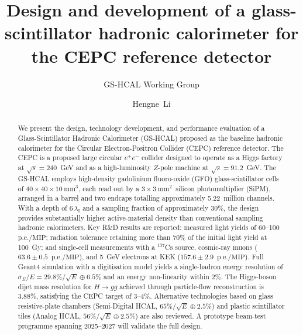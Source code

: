 \documentclass[preprint,12pt,times]{elsarticle}
\newcommand{\lambdaI}{\ensuremath{\lambda_{\mathrm{I}}}\xspace}
\newcommand{\peMIP}{\ensuremath{\text{p.e.}/\text{MIP}}\xspace}
\newcommand{\cellsize}{\ensuremath{40\times40\times10~\text{mm}^{3}}\xspace}
\newcommand{\sipmsize}{\ensuremath{3\times3~\text{mm}^{2}}\xspace}
\begin{document}
\begin{frontmatter}

\title{Design and development of a glass-scintillator hadronic calorimeter
for the CEPC reference detector}

\author[scnu]{GS-HCAL Working Group}

\author[scnu]{Hengne~Li}


\begin{abstract}
We present the design, technology development, and performance evaluation
of a Glass-Scintillator Hadronic Calorimeter (GS-HCAL) proposed as the
baseline hadronic calorimeter for the Circular Electron-Positron Collider
(CEPC) reference detector.
The CEPC is a proposed large circular $e^{+}e^{-}$ collider designed to
operate as a Higgs factory at $\sqrt{s}=240$~GeV and as a high-luminosity
$Z$-pole machine at $\sqrt{s}=91.2$~GeV.
The GS-HCAL employs high-density gadolinium fluoro-oxide (GFO)
glass-scintillator cells of \cellsize, each read out by a
\sipmsize~silicon photomultiplier (SiPM), arranged in a barrel and two
endcaps totalling approximately 5.22~million channels.
With a depth of $6\,\lambdaI$ and a sampling fraction of approximately
30\%, the design provides substantially higher active-material density
than conventional sampling hadronic calorimeters.
Key R\&D results are reported: measured light yields of 60--100~\peMIP;
radiation tolerance retaining more than 70\% of the initial light yield
at \SI{100}{Gy}; and single-cell measurements with a $^{137}$Cs source,
cosmic-ray muons ($63.6\pm0.5$~\peMIP), and \SI{5}{GeV} electrons at
KEK ($157.6\pm2.9$~\peMIP).
Full Geant4 simulation with a digitisation model yields a single-hadron
energy resolution of $\sigma_{E}/E = 29.8\%/\sqrt{E}\oplus6.5\%$ and
an energy non-linearity within 2\%.
The Higgs-boson dijet mass resolution for $H\to gg$ achieved through
particle-flow reconstruction is 3.88\%, satisfying the CEPC target of
3--4\%.
Alternative technologies based on glass resistive-plate chambers
(Semi-Digital HCAL, $65\%/\sqrt{E}\oplus2.5\%$) and plastic scintillator
tiles (Analog HCAL, $56\%/\sqrt{E}\oplus2.5\%$) are also reviewed.
A prototype beam-test programme spanning 2025--2027 will validate the
full design.
\end{abstract}


\end{frontmatter}
\end{document}

